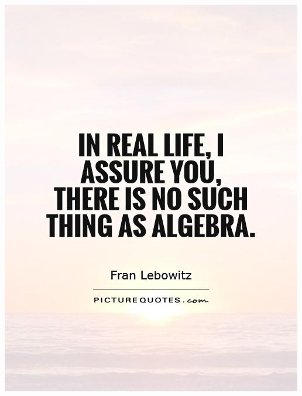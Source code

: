 \begin{frame}
	\begin{center}
		\includegraphics[scale=0.3]{will-i-use-algebra.jpg}
	\end{center}
\end{frame}


